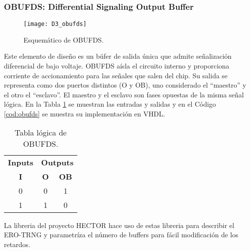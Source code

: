                 \vspace{0.4cm}
                

            \subsubsection{OBUFDS: Differential Signaling Output Buffer}

                \begin{figure}[hbtp]
                    \caption{Esquemático de OBUFDS.}
                    \centering
                    \texttt{[image: D3\_obufds]}
                    \label{fig:D3_obufds}
                \end{figure}	

                Este elemento de diseño es un búfer de salida única que admite señalización diferencial de bajo voltaje. OBUFDS aísla el circuito interno y proporciona corriente de accionamiento para las señales que salen del chip. Su salida se representa como dos puertos distintos (O y OB), uno considerado el ``maestro'' y el otro el ``esclavo''. El maestro y el esclavo son fases opuestas de la misma señal lógica.  En la Tabla \ref{tab:obufds} se muestran las entradas y salidas y en el Código \ref{cod:obufds} se muestra su implementación en VHDL.
                
                \begin{table}[htbp]
                    \centering
                    \caption{Tabla lógica de OBUFDS.}
                    \begin{tabular}{|c|cc|}
                        \hline
                        \textbf{Inputs} & \multicolumn{2}{c|}{\textbf{Outputs}} \\ 
                        \textbf{I}      & \multicolumn{1}{c}{\textbf{O}}  & \textbf{OB} \\ 
                        \hline
                        0      & \multicolumn{1}{c|}{0}  & 1  \\ \hline
                        1      & \multicolumn{1}{c|}{1}  & 0  \\ \hline
                    \end{tabular}
                    \label{tab:obufds}
                \end{table}

                \vspace{0.4cm}
                

                La libreria del proyecto HECTOR \cite{Laban2016} hace uso de estas libreria para describir el ERO-TRNG y parametríza el número de buffers para fácil modificación de los retardos.

